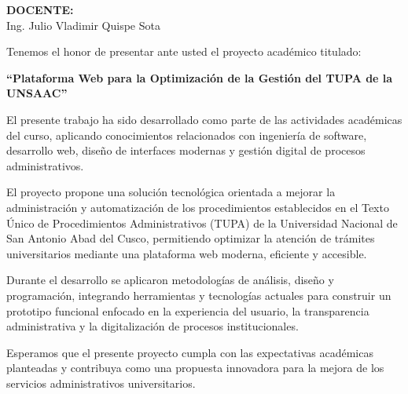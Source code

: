\begin{presentacion}
\vspace{1cm}

\noindent
\textbf{DOCENTE:} \\
Ing. Julio Vladimir Quispe Sota

\vspace{0.2cm}

\noindent
Tenemos el honor de presentar ante usted el proyecto académico titulado:

\vspace{0.2cm}

\begin{center}
    \Large
    \textbf{``Plataforma Web para la Optimización de la Gestión del TUPA de la UNSAAC''}
\end{center}

\vspace{0.4cm}

\noindent
El presente trabajo ha sido desarrollado como parte de las actividades académicas del curso, aplicando conocimientos relacionados con ingeniería de software, desarrollo web, diseño de interfaces modernas y gestión digital de procesos administrativos.

\vspace{0.4cm}

\noindent
El proyecto propone una solución tecnológica orientada a mejorar la administración y automatización de los procedimientos establecidos en el Texto Único de Procedimientos Administrativos (TUPA) de la Universidad Nacional de San Antonio Abad del Cusco, permitiendo optimizar la atención de trámites universitarios mediante una plataforma web moderna, eficiente y accesible.

\vspace{0.4cm}

\noindent
Durante el desarrollo se aplicaron metodologías de análisis, diseño y programación, integrando herramientas y tecnologías actuales para construir un prototipo funcional enfocado en la experiencia del usuario, la transparencia administrativa y la digitalización de procesos institucionales.

\vspace{0.4cm}

\noindent
Esperamos que el presente proyecto cumpla con las expectativas académicas planteadas y contribuya como una propuesta innovadora para la mejora de los servicios administrativos universitarios.

\vspace{1.2cm}


\end{presentacion}

